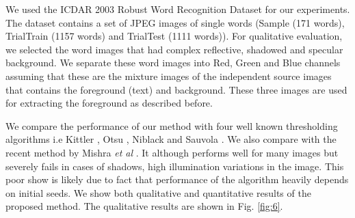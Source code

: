 We used the ICDAR 2003 Robust Word Recognition Dataset \cite{A15} for our experiments.
The dataset contains a set of JPEG images of single words (Sample (171 words), 
TrialTrain (1157 words) and TrialTest (1111 words)). For qualitative evaluation,
we selected the word images that had complex reflective, shadowed and specular background.  
We separate these word images into Red, Green and Blue channels
assuming that these are the mixture images of the independent source images
that contains the foreground (text) and background. These three images are used
for extracting the foreground as described before.

\begin{table}[ht]
\centering
 \caption{Quantitative Results (Average)}
\end{table}
\begin{table}[ht]
\centering
 \caption{OCR Accuracy (\%)}
\end{table}

We compare the performance of our method with four well known thresholding algorithms 
i.e Kittler \cite{A5}, Otsu \cite{A2}, Niblack \cite{A9} and Sauvola \cite{A6}.
We also compare with the recent method by Mishra \emph{et al} \cite{A16}.
It although performs well for many images but severely
fails in cases of shadows, high illumination variations 
in the image. This poor show is likely due to fact that
performance of the algorithm heavily depends on initial seeds.
We show both qualitative and quantitative results of the proposed method. 
The qualitative results are shown in Fig. \ref{fig:6}.

